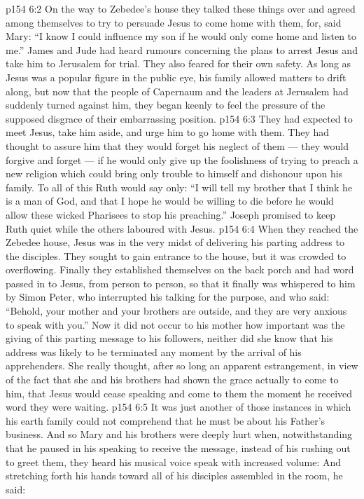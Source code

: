 \vs p154 6:2 On the way to Zebedee’s house they talked these things over and agreed among themselves to try to persuade Jesus to come home with them, for, said Mary: “I know I could influence my son if he would only come home and listen to me.” James and Jude had heard rumours concerning the plans to arrest Jesus and take him to Jerusalem for trial. They also feared for their own safety. As long as Jesus was a popular figure in the public eye, his family allowed matters to drift along, but now that the people of Capernaum and the leaders at Jerusalem had suddenly turned against him, they began keenly to feel the pressure of the supposed disgrace of their embarrassing position.
\vs p154 6:3 They had expected to meet Jesus, take him aside, and urge him to go home with them. They had thought to assure him that they would forget his neglect of them --- they would forgive and forget --- if he would only give up the foolishness of trying to preach a new religion which could bring only trouble to himself and dishonour upon his family. To all of this Ruth would say only: “I will tell my brother that I think he is a man of God, and that I hope he would be willing to die before he would allow these wicked Pharisees to stop his preaching.” Joseph promised to keep Ruth quiet while the others laboured with Jesus.
\vs p154 6:4 When they reached the Zebedee house, Jesus was in the very midst of delivering his parting address to the disciples. They sought to gain entrance to the house, but it was crowded to overflowing. Finally they established themselves on the back porch and had word passed in to Jesus, from person to person, so that it finally was whispered to him by Simon Peter, who interrupted his talking for the purpose, and who said: “Behold, your mother and your brothers are outside, and they are very anxious to speak with you.” Now it did not occur to his mother how important was the giving of this parting message to his followers, neither did she know that his address was likely to be terminated any moment by the arrival of his apprehenders. She really thought, after so long an apparent estrangement, in view of the fact that she and his brothers had shown the grace actually to come to him, that Jesus would cease speaking and come to them the moment he received word they were waiting.
\vs p154 6:5 It was just another of those instances in which his earth family could not comprehend that he must be about his Father’s business. And so Mary and his brothers were deeply hurt when, notwithstanding that he paused in his speaking to receive the message, instead of his rushing out to greet them, they heard his musical voice speak with increased volume:  And stretching forth his hands toward all of his disciples assembled in the room, he said: 
